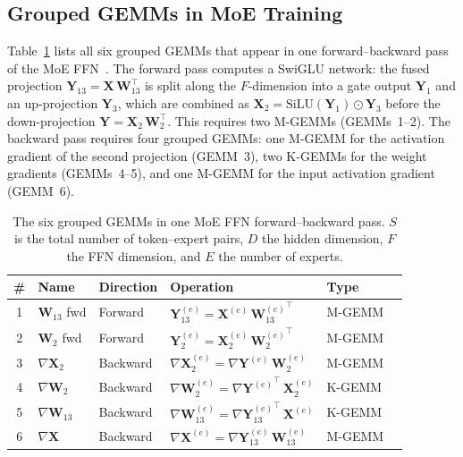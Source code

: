 \documentclass[11pt,a4paper]{article}
\theoremstyle{definition}
\begin{document}
\subsection{Grouped GEMMs in MoE Training}
\label{sec:gemm-inventory}

Table~\ref{tab:gemm-inventory} lists all six grouped GEMMs that appear in
one forward--backward pass of the MoE
FFN~\cite{nvidia2026megatronmoe}. The forward pass computes
a SwiGLU network: the fused projection
$\mathbf{Y}_{13} = \mathbf{X}\,\mathbf{W}_{13}^{\top}$ is split along the
$F$-dimension into a gate output $\mathbf{Y}_{1}$ and an up-projection
$\mathbf{Y}_{3}$, which are combined as
$\mathbf{X}_{2} = \mathrm{SiLU}(\mathbf{Y}_{1}) \odot \mathbf{Y}_{3}$
before the down-projection $\mathbf{Y} = \mathbf{X}_{2}\,\mathbf{W}_{2}^{\top}$.
This requires two M-GEMMs (GEMMs~1--2). The backward pass requires four grouped
GEMMs: one M-GEMM for the activation gradient of the second projection
(GEMM~3), two K-GEMMs for the weight gradients (GEMMs~4--5), and one
M-GEMM for the input activation gradient (GEMM~6).

\begin{table}[t]
\centering
\caption{The six grouped GEMMs in one MoE FFN forward--backward pass.
$S$ is the total number of token--expert pairs, $D$ the hidden dimension,
$F$ the FFN dimension, and $E$ the number of experts.}
\label{tab:gemm-inventory}
\small
\begin{tabular}{@{}clllll@{}}
\toprule
\# & Name & Direction & Operation & Type \\
\midrule
1 & $\mathbf{W}_{13}$ fwd
  & Forward
  & $\mathbf{Y}_{13}^{(e)} = \mathbf{X}^{(e)}\,{\mathbf{W}_{13}^{(e)}}^{\!\top}$
  & M-GEMM \\
2 & $\mathbf{W}_{2}$ fwd
  & Forward
  & $\mathbf{Y}_{2}^{(e)} = \mathbf{X}_{2}^{(e)}\,{\mathbf{W}_{2}^{(e)}}^{\!\top}$
  & M-GEMM \\
\midrule
3 & $\nabla\mathbf{X}_2$
  & Backward
  & $\nabla\!\mathbf{X}_{2}^{(e)} = \nabla\!\mathbf{Y}^{(e)}\,\mathbf{W}_{2}^{(e)}$
  & M-GEMM \\
4 & $\nabla\mathbf{W}_2$
  & Backward
  & $\nabla\!\mathbf{W}_{2}^{(e)} = {\nabla\!\mathbf{Y}^{(e)}}^{\!\top}\,\mathbf{X}_{2}^{(e)}$
  & K-GEMM \\
5 & $\nabla\mathbf{W}_{13}$
  & Backward
  & $\nabla\!\mathbf{W}_{13}^{(e)} = {\nabla\!\mathbf{Y}_{13}^{(e)}}^{\!\top}\,\mathbf{X}^{(e)}$
  & K-GEMM \\
6 & $\nabla\mathbf{X}$
  & Backward
  & $\nabla\!\mathbf{X}^{(e)} = \nabla\!\mathbf{Y}_{13}^{(e)}\,\mathbf{W}_{13}^{(e)}$
  & M-GEMM \\
\bottomrule
\end{tabular}
\end{table}
\end{document}

